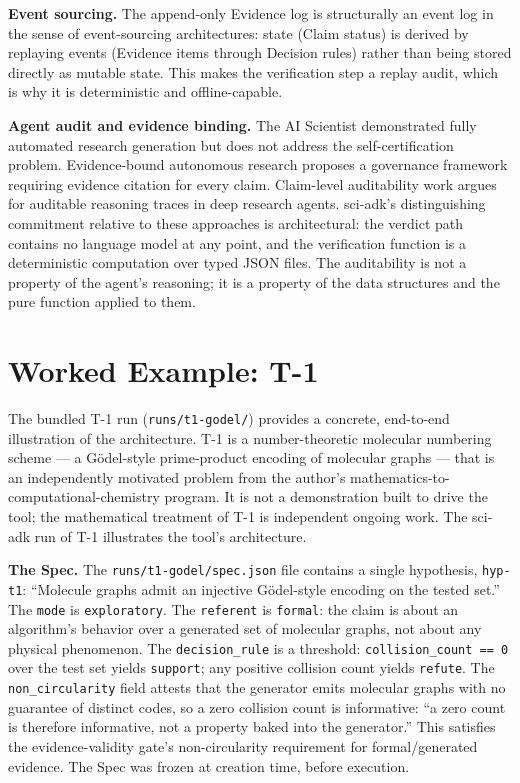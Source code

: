 \documentclass[11pt]{article}
\begin{document}
\textbf{Event sourcing.} The append-only Evidence log is structurally an event log in the sense of event-sourcing architectures: state (Claim status) is derived by replaying events (Evidence items through Decision rules) rather than being stored directly as mutable state. This makes the verification step a replay audit, which is why it is deterministic and offline-capable.

\textbf{Agent audit and evidence binding.} The AI Scientist \citep{aiscientist} demonstrated fully automated research generation but does not address the self-certification problem. Evidence-bound autonomous research \citep{evibound} proposes a governance framework requiring evidence citation for every claim. Claim-level auditability work \citep{aar} argues for auditable reasoning traces in deep research agents. sci-adk's distinguishing commitment relative to these approaches is architectural: the verdict path contains no language model at any point, and the verification function is a deterministic computation over typed JSON files. The auditability is not a property of the agent's reasoning; it is a property of the data structures and the pure function applied to them.

\section{Worked Example: T-1}

The bundled T-1 run (\texttt{runs/t1-godel/}) provides a concrete, end-to-end illustration of the architecture. T-1 is a number-theoretic molecular numbering scheme --- a G\"{o}del-style prime-product encoding of molecular graphs --- that is an independently motivated problem from the author's mathematics-to-computational-chemistry program. It is not a demonstration built to drive the tool; the mathematical treatment of T-1 is independent ongoing work. The sci-adk run of T-1 illustrates the tool's architecture.

\textbf{The Spec.} The \texttt{runs/t1-godel/spec.json} file contains a single hypothesis, \texttt{hyp-t1}: ``Molecule graphs admit an injective G\"{o}del-style encoding on the tested set.'' The \texttt{mode} is \texttt{exploratory}. The \texttt{referent} is \texttt{formal}: the claim is about an algorithm's behavior over a generated set of molecular graphs, not about any physical phenomenon. The \texttt{decision\_rule} is a threshold: \texttt{collision\_count == 0} over the test set yields \texttt{support}; any positive collision count yields \texttt{refute}. The \texttt{non\_circularity} field attests that the generator emits molecular graphs with no guarantee of distinct codes, so a zero collision count is informative: ``a zero count is therefore informative, not a property baked into the generator.'' This satisfies the evidence-validity gate's non-circularity requirement for formal/generated evidence. The Spec was frozen at creation time, before execution.
\end{document}
